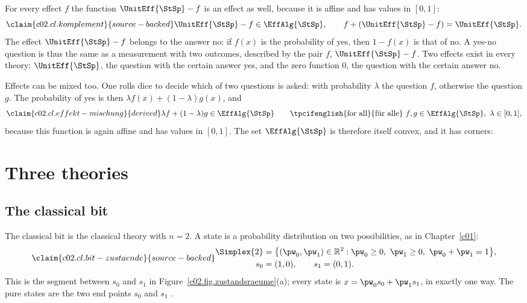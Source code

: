 
For every effect $f$ the function $\UnitEff{\StSp} - f$ is an effect as well, because it is
affine and has values in $[0,1]$:
\begin{equation}\label{c02.eq.komplement}\claim{c02.cl.komplement}{source-backed}
  \UnitEff{\StSp} - f \in \EffAlg{\StSp},
  \qquad f + (\UnitEff{\StSp} - f) = \UnitEff{\StSp} .
\end{equation}
The effect $\UnitEff{\StSp} - f$ belongs to the answer no: if $f(x)$ is the probability of
yes, then $1 - f(x)$ is that of no. A yes-no question is thus the same as a measurement
with two outcomes, described by the pair $f$, $\UnitEff{\StSp} - f$. Two effects exist in
every theory: $\UnitEff{\StSp}$, the question with the certain answer yes, and the zero
function $0$, the question with the certain answer no.

Effects can be mixed too. One rolls dice to decide which of two questions is asked: with
probability $\lambda$ the question $f$, otherwise the question $g$. The probability of yes
is then $\lambda f(x) + (1-\lambda) g(x)$, and
\begin{equation}\label{c02.eq.effekt-mischung}\claim{c02.cl.effekt-mischung}{derived}
  \lambda f + (1-\lambda) g \in \EffAlg{\StSp}
  \qquad \text{\tpcifenglish{for all}{für alle}}\ f, g \in \EffAlg{\StSp},\ \lambda \in [0,1] ,
\end{equation}
because this function is again affine and has values in $[0,1]$. The set
$\EffAlg{\StSp}$ is therefore itself convex, and it has corners:


\section{Three theories}\label{c02.s4}

\subsection{The classical bit}\label{c02.s4.1}


The classical bit is the classical theory with $n = 2$. A state is a probability
distribution on two possibilities, as in Chapter~\ref{c01}:
\begin{equation}\label{c02.eq.bit}\claim{c02.cl.bit-zustaende}{source-backed}
  \begin{aligned}
    \Simplex{2} &= \bigl\{ (\pw_0, \pw_1) \in \mathbb{R}^2 : \pw_0 \geq 0,\ \pw_1 \geq 0,\ \pw_0 + \pw_1 = 1 \bigr\}, \\
    s_0 &= (1,0), \qquad s_1 = (0,1) .
  \end{aligned}
\end{equation}
This is the segment between $s_0$ and $s_1$ in Figure~\ref{c02.fig.zustandsraeume}(a);
every state is $x = \pw_0 s_0 + \pw_1 s_1$, in exactly one way. The pure states are the two
end points $s_0$ and $s_1$
.

